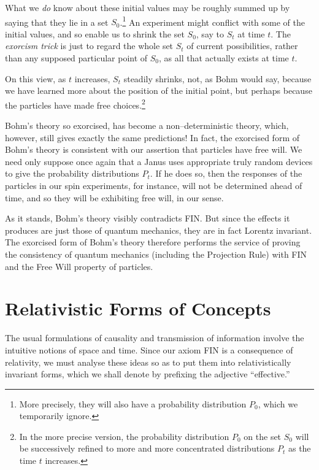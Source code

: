 \documentclass[12pt]{amsart}
\begin{document}
\renewcommand{\thefootnote}{$\star${}}

What we {\em do} know about these initial values may be 
roughly summed up by saying that they lie in a set 
$S_0$.\footnote{More precisely, they will also have a probability distribution $P_0$, which we temporarily ignore.}
An experiment might conflict with some of the initial values, 
and so enable us to shrink the set $S_0$, say to $S_t$ at 
time $t$. The {\em exorcism trick} is just to regard the whole set $S_t$ of
current possibilities, rather than any supposed particular point 
of $S_0$, as all 
that actually  exists at time $t$.

\renewcommand{\thefootnote}{$\dagger${}}

On this view, as $t$ increases, $S_t$ steadily shrinks, not, as Bohm would say, 
because we have learned more about the position of the initial point, 
but perhaps because the particles have made free choices.\footnote{In the more precise version, the probability distribution $P_0$ on the set $S_0$ will be successively refined to more and more concentrated distributions $P_t$ as the time $t$ increases.}

Bohm's theory so exorcised, has become a non--deterministic theory,
which, however, still gives exactly the same predictions!  In fact, the 
exorcised form of Bohm's theory is consistent with our assertion that particles
have free will.  We need only suppose once again that a Janus uses appropriate 
truly random devices to give the probability distributions $P_t$.  
If he does so, then the responses of the particles in our spin experiments, 
for instance, will not be determined ahead of time, and so they will be 
exhibiting free will, in our sense.

As it stands, Bohm's theory visibly contradicts FIN. But since the 
effects it produces are just those of quantum mechanics, they are 
in fact Lorentz invariant.  The exorcised form of Bohm's theory 
therefore performs the service of proving the consistency of 
quantum mechanics (including the Projection Rule) with FIN and the 
Free Will property of particles.
\section{Relativistic Forms of Concepts}%

The usual formulations of causality and transmission of information involve 
the intuitive notions of space and time.  Since our axiom FIN is a consequence
of relativity, we must analyse these ideas so as to put them into 
relativistically invariant forms, which we shall denote by prefixing 
the adjective ``effective.''
\end{document}
